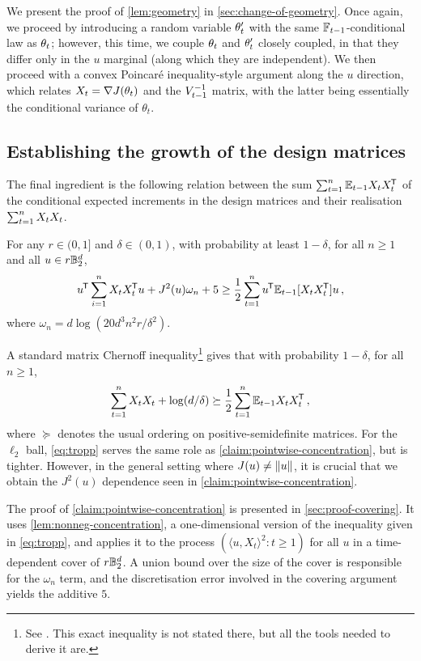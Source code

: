 \noindent We present the proof of \cref{lem:geometry} in \cref{sec:change-of-geometry}. Once again, we proceed by introducing a random variable $\theta_t'$ with the same $\mathbb{F}_{t-1}$-conditional law as $\theta_t$; however, this time, we couple $\theta_t$ and $\theta_t'$ closely coupled, in that they differ only in the $u$ marginal (along which they are independent). We then proceed with a convex Poincar\'e inequality-style argument along the $u$ direction, which relates $X_t = \nabla J(\theta_t)$ and the $V_{t-1}^{-1}$ matrix, with the latter being essentially the conditional variance of $\theta_t$.

\subsection{Establishing the growth of the design matrices} 
The final ingredient is the following relation between the sum $\sum_{t=1}^n \mathbb{E}_{t-1} X_tX_t^{\mkern-1.5mu\mathsf{T}}$ of the conditional expected increments in the design matrices and their realisation $\sum_{t=1}^n X_tX_t$.

\begin{lemma}\label{claim:pointwise-concentration}
  For any $r \in (0, 1]$ and $\delta \in (0,1)$, with probability at least $1-\delta$, for all $n \geq 1$ and all $u \in r\mathbb{B}^d_2$,
  $$
      u^{\mkern-1.5mu\mathsf{T}} \sum_{i=1}^n X_tX_t^{\mkern-1.5mu\mathsf{T}} u + J^2(u) \omega_n  + 5 \geq \frac{1}{2}\sum_{t=1}^n u^{\mkern-1.5mu\mathsf{T}} \mathbb{E}_{t-1}[X_tX_t^{\mkern-1.5mu\mathsf{T}}] u \,,
  $$
  where $\omega_n = d\log(20d^3n^2r/\delta^2)$.
\end{lemma}

\begin{remark}
  A standard matrix Chernoff inequality\footnote{See \citet{tropp2012user}. This exact inequality is not stated there, but all the tools needed to derive it are.} gives that with probability $1-\delta$, for all $n \geq 1$,
  \begin{equation}\label{eq:tropp}
    \sum_{t=1}^n X_tX_t + \log(d/\delta) \succeq \frac{1}{2} \sum_{t=1}^n \mathbb{E}_{t-1} X_tX_t^{\mkern-1.5mu\mathsf{T}}\,,
  \end{equation}
  where $\succeq$ denotes the usual ordering on positive-semidefinite matrices. For the $\ell_2$ ball, \cref{eq:tropp} serves the same role as \cref{claim:pointwise-concentration}, but is tighter.  However, in the general setting where $J(u) \neq \|u\|$, it is crucial that we obtain the $J^2(u)$ dependence seen in \cref{claim:pointwise-concentration}. 
\end{remark}

\noindent The proof of \cref{claim:pointwise-concentration} is presented in \cref{sec:proof-covering}. It uses \cref{lem:nonneg-concentration}, a one-dimensional version of the inequality given in \cref{eq:tropp}, and applies it to the process $(\langle u, X_t \rangle^2 \colon t \geq 1)$ for all $u$ in a time-dependent cover of $r\mathbb{B}^d_2$. A union bound over the size of the cover is responsible for the $\omega_n$ term, and the discretisation error involved in the covering argument yields the additive $5$.

